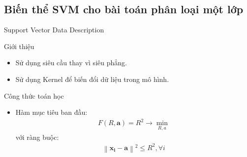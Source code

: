 \documentclass[
	10pt,                %
	aspectratio=169,     %
]{beamer}
\begin{document}
\subsection{Biến thể SVM cho bài toán phân loại một lớp}
     \begin{frame}{Support Vector Data Description}
    \begin{block}{Giới thiệu}
    	\begin{itemize}
    		\item  Sử dụng siêu cầu thay vì siêu phẳng.
    		\item Sử dụng Kernel để biến đổi dữ liệu trong mô hình.
    	\end{itemize}
        \end{block}
        
        \begin{block}{Công thức toán học}
    	\begin{itemize}
    		\item Hàm mục tiêu ban đầu:
    		\begin{equation}\label{svdd1}
                \begin{align}
                     F(R, \mathbf{a})= R^{2} \rightarrow  \min_{R, a}
                \end{align}
            \end{equation}
            với ràng buộc:
            \begin{equation}\label{svdd2}
                \begin{align}
                    \left \| \mathbf{x_{i}} -\mathbf{a }\right \|^{2}\leqslant R^{2}, \forall i 
                \end{align}
            \end{equation}
    	\end{itemize}
        \end{block}
    \end{frame}	   
    
\end{document}
